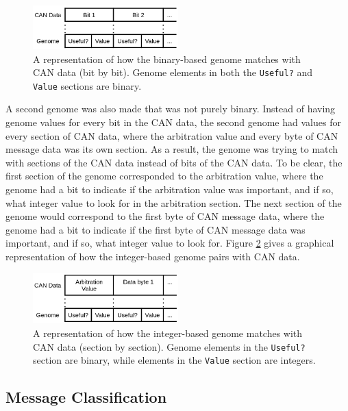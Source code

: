 \documentclass[10pt,conference]{IEEEtran}
\begin{document}
\begin{figure}[H]
    \centering
    \includegraphics[width=0.5\textwidth]{binary-genome.png}
    \caption{A representation of how the binary-based genome matches with CAN data (bit by bit). Genome elements in both the \texttt{Useful?} and \texttt{Value} sections are binary.}
    \label{binarygenome}
\end{figure}

A second genome was also made that was not purely binary.  Instead of having genome values for every bit in the CAN data, the second genome had values for every section of CAN data, where the arbitration value and every byte of CAN message data was its own section.  As a result, the genome was trying to match with sections of the CAN data instead of bits of the CAN data.  To be clear, the first section of the genome corresponded to the arbitration value, where the genome had a bit to indicate if the arbitration value was important, and if so, what integer value to look for in the arbitration section.  The next section of the genome would correspond to the first byte of CAN message data, where the genome had a bit to indicate if the first byte of CAN message data was important, and if so, what integer value to look for. Figure \ref{integergenome} gives a graphical representation of how the integer-based genome pairs with CAN data.  

\begin{figure}[H]
    \centering
    \includegraphics[width=0.5\textwidth]{integer-genome.png}
    \caption{A representation of how the integer-based genome matches with CAN data (section by section). Genome elements in the \texttt{Useful?} section are binary, while elements in the \texttt{Value} section are integers.}
    \label{integergenome}
\end{figure}

\subsection{Message Classification}
\end{document}

